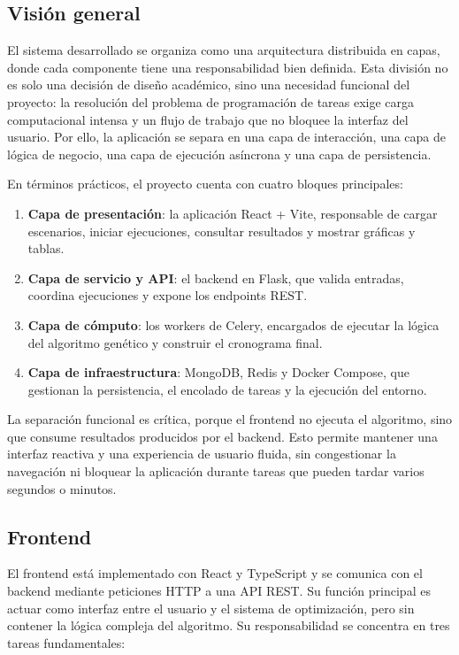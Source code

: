 \documentclass[11pt,a4paper]{article}
\begin{document}
\subsection{Visión general}

El sistema desarrollado se organiza como una arquitectura distribuida en capas, donde cada componente tiene una responsabilidad bien definida. Esta división no es solo una decisión de diseño académico, sino una necesidad funcional del proyecto: la resolución del problema de programación de tareas exige carga computacional intensa y un flujo de trabajo que no bloquee la interfaz del usuario. Por ello, la aplicación se separa en una capa de interacción, una capa de lógica de negocio, una capa de ejecución asíncrona y una capa de persistencia.

En términos prácticos, el proyecto cuenta con cuatro bloques principales:

\begin{enumerate}
    \item \textbf{Capa de presentación}: la aplicación React + Vite, responsable de cargar escenarios, iniciar ejecuciones, consultar resultados y mostrar gráficas y tablas.
    \item \textbf{Capa de servicio y API}: el backend en Flask, que valida entradas, coordina ejecuciones y expone los endpoints REST.
    \item \textbf{Capa de cómputo}: los workers de Celery, encargados de ejecutar la lógica del algoritmo genético y construir el cronograma final.
    \item \textbf{Capa de infraestructura}: MongoDB, Redis y Docker Compose, que gestionan la persistencia, el encolado de tareas y la ejecución del entorno.
\end{enumerate}

La separación funcional es crítica, porque el frontend no ejecuta el algoritmo, sino que consume resultados producidos por el backend. Esto permite mantener una interfaz reactiva y una experiencia de usuario fluida, sin congestionar la navegación ni bloquear la aplicación durante tareas que pueden tardar varios segundos o minutos.

\subsection{Frontend}

El frontend está implementado con React y TypeScript y se comunica con el backend mediante peticiones HTTP a una API REST. Su función principal es actuar como interfaz entre el usuario y el sistema de optimización, pero sin contener la lógica compleja del algoritmo. Su responsabilidad se concentra en tres tareas fundamentales:
\end{document}
